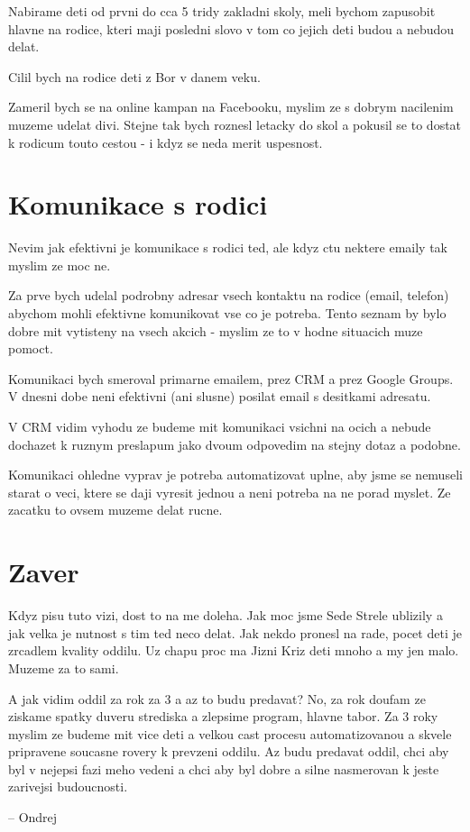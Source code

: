 \documentclass[12pt,a4paper]{article}
\begin{document}
Nabirame deti od prvni do cca 5 tridy zakladni skoly, meli bychom zapusobit hlavne na rodice, kteri maji posledni slovo v tom co jejich deti budou a nebudou delat.

Cilil bych na rodice deti z Bor v danem veku.

Zameril bych se na online kampan na Facebooku, myslim ze s dobrym nacilenim muzeme udelat divi. Stejne tak bych roznesl letacky do skol a pokusil se to dostat k rodicum touto cestou - i kdyz se neda merit uspesnost.


\section{Komunikace s rodici}

Nevim jak efektivni je komunikace s rodici ted, ale kdyz ctu nektere emaily tak myslim ze moc ne.

Za prve bych udelal podrobny adresar vsech kontaktu na rodice (email, telefon) abychom mohli efektivne komunikovat vse co je potreba. Tento seznam by bylo dobre mit vytisteny na vsech akcich - myslim ze to v hodne situacich muze pomoct.

Komunikaci bych smeroval primarne emailem, prez CRM a prez Google Groups. V dnesni dobe neni efektivni (ani slusne) posilat email s desitkami adresatu.

V CRM vidim vyhodu ze budeme mit komunikaci vsichni na ocich a nebude dochazet k ruznym preslapum jako dvoum odpovedim na stejny dotaz a podobne.

Komunikaci ohledne vyprav je potreba automatizovat uplne, aby jsme se nemuseli starat o veci, ktere se daji vyresit jednou a neni potreba na ne porad myslet. Ze zacatku to ovsem muzeme delat rucne.

\section*{Zaver}

Kdyz pisu tuto vizi, dost to na me doleha. Jak moc jsme Sede Strele ublizily a jak velka je nutnost s tim ted neco delat. Jak nekdo pronesl na rade, pocet deti je zrcadlem kvality oddilu. Uz chapu proc ma Jizni Kriz deti mnoho a my jen malo. Muzeme za to sami.

A jak vidim oddil za rok za 3 a az to budu predavat? No, za rok doufam ze ziskame spatky duveru strediska a zlepsime program, hlavne tabor. Za 3 roky myslim ze budeme mit vice deti a velkou cast procesu automatizovanou a skvele pripravene soucasne rovery k prevzeni oddilu. Az budu predavat oddil, chci aby byl v nejepsi fazi meho vedeni a chci aby byl dobre a silne nasmerovan k jeste zarivejsi budoucnosti.

-- Ondrej
\end{document}
